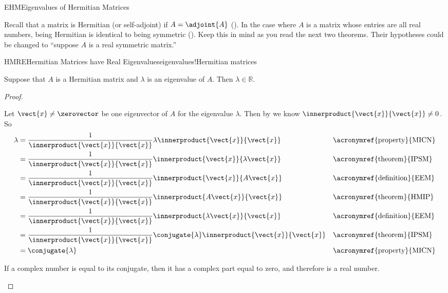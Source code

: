 \begin{subsect}{EHM}{Eigenvalues of Hermitian Matrices}
%
\begin{para}Recall that a matrix is Hermitian (or self-adjoint) if $A=\adjoint{A}$ ().  In the case where $A$ is a matrix whose entries are all real numbers, being Hermitian is identical to being symmetric ().  Keep this in mind as you read the next two theorems.  Their hypotheses could be changed to ``suppose $A$ is a real symmetric matrix.''\end{para}
%
\begin{theorem}{HMRE}{Hermitian Matrices have Real Eigenvalues}{eigenvalues!Hermitian matrices}
\begin{para}Suppose that $A$ is a Hermitian matrix and $\lambda$ is an eigenvalue of $A$.  Then $\lambda\in{\mathbb R}$.\end{para}
\end{theorem}
%
\begin{proof}
\begin{para}Let $\vect{x}\neq\zerovector$ be one eigenvector of $A$ for the eigenvalue $\lambda$.   Then by  we know $\innerproduct{\vect{x}}{\vect{x}}\neq 0$.  So
%
\begin{align*}
\lambda
%
&=\frac{1}{\innerproduct{\vect{x}}{\vect{x}}}\lambda\innerproduct{\vect{x}}{\vect{x}}
&&\text{\acronymref{property}{MICN}}\\
%
&=\frac{1}{\innerproduct{\vect{x}}{\vect{x}}}\innerproduct{\vect{x}}{\lambda\vect{x}}
&&\text{\acronymref{theorem}{IPSM}}\\
%
&=\frac{1}{\innerproduct{\vect{x}}{\vect{x}}}\innerproduct{\vect{x}}{A\vect{x}}
&&\text{\acronymref{definition}{EEM}}\\
%
&=\frac{1}{\innerproduct{\vect{x}}{\vect{x}}}\innerproduct{A\vect{x}}{\vect{x}}
&&\text{\acronymref{theorem}{HMIP}}\\
%
&=\frac{1}{\innerproduct{\vect{x}}{\vect{x}}}\innerproduct{\lambda\vect{x}}{\vect{x}}
&&\text{\acronymref{definition}{EEM}}\\
%
&=\frac{1}{\innerproduct{\vect{x}}{\vect{x}}}\conjugate{\lambda}\innerproduct{\vect{x}}{\vect{x}}
&&\text{\acronymref{theorem}{IPSM}}\\
%
&=\conjugate{\lambda}
&&\text{\acronymref{property}{MICN}}
\end{align*}
\end{para}
%
\begin{para}If a complex number is equal to its conjugate, then it has a complex part equal to zero, and therefore is a real number.\end{para}

\end{proof}
\end{subsect}
